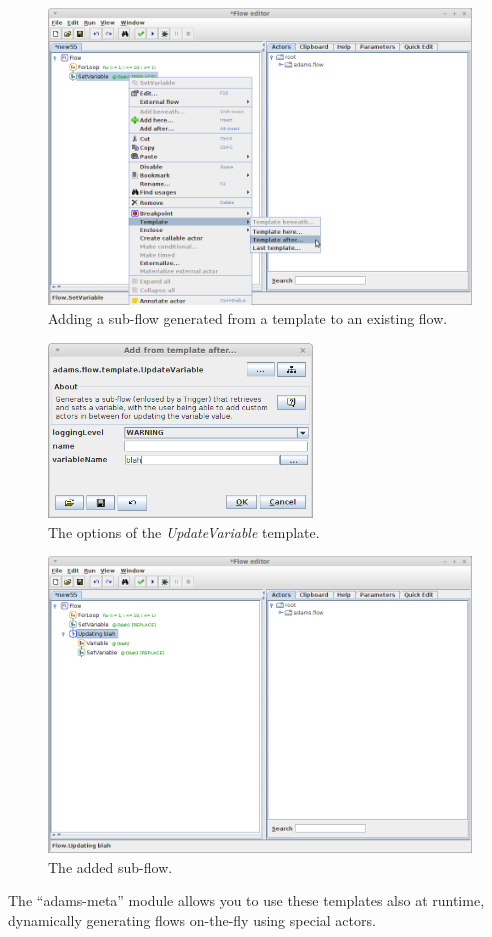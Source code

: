 \begin{figure}[htb]
  \centering
  \includegraphics[width=12.0cm]{images/template-static_use1.png}
  \caption{Adding a sub-flow generated from a template to an existing flow.}
  \label{template-static_use1}
\end{figure}

\begin{figure}[htb]
  \centering
  \includegraphics[width=7.0cm]{images/template-static_use2.png}
  \caption{The options of the \textit{UpdateVariable} template.}
  \label{template-static_use2}
\end{figure}

\begin{figure}[htb]
  \centering
  \includegraphics[width=12.0cm]{images/template-static_use3.png}
  \caption{The added sub-flow.}
  \label{template-static_use3}
\end{figure}
The ``adams-meta'' module allows you to use these templates also at runtime,
dynamically generating flows on-the-fly using special actors.

